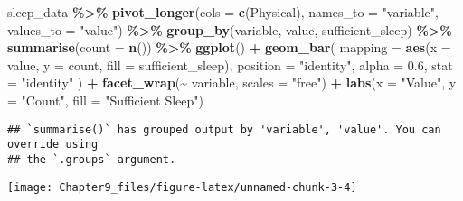 \documentclass[
  11pt,
]{article}
\newenvironment{Shaded}{\begin{snugshade}}{\end{snugshade}}
\newcommand{\AttributeTok}[1]{\textcolor[rgb]{0.13,0.29,0.53}{#1}}
\newcommand{\FloatTok}[1]{\textcolor[rgb]{0.00,0.00,0.81}{#1}}
\newcommand{\FunctionTok}[1]{\textcolor[rgb]{0.13,0.29,0.53}{\textbf{#1}}}
\newcommand{\NormalTok}[1]{#1}
\newcommand{\SpecialCharTok}[1]{\textcolor[rgb]{0.81,0.36,0.00}{\textbf{#1}}}
\newcommand{\StringTok}[1]{\textcolor[rgb]{0.31,0.60,0.02}{#1}}
\begin{document}
\begin{Shaded}
\begin{Highlighting}[]
\NormalTok{sleep\_data }\SpecialCharTok{\%\textgreater{}\%}
  \FunctionTok{pivot\_longer}\NormalTok{(}\AttributeTok{cols =} \FunctionTok{c}\NormalTok{(Physical), }\AttributeTok{names\_to =} \StringTok{"variable"}\NormalTok{, }\AttributeTok{values\_to =} \StringTok{"value"}\NormalTok{) }\SpecialCharTok{\%\textgreater{}\%}
  \FunctionTok{group\_by}\NormalTok{(variable, value, sufficient\_sleep) }\SpecialCharTok{\%\textgreater{}\%}
  \FunctionTok{summarise}\NormalTok{(}\AttributeTok{count =} \FunctionTok{n}\NormalTok{()) }\SpecialCharTok{\%\textgreater{}\%}
  \FunctionTok{ggplot}\NormalTok{() }\SpecialCharTok{+}
  \FunctionTok{geom\_bar}\NormalTok{(}
    \AttributeTok{mapping =} \FunctionTok{aes}\NormalTok{(}\AttributeTok{x =}\NormalTok{ value, }\AttributeTok{y =}\NormalTok{ count, }\AttributeTok{fill =}\NormalTok{ sufficient\_sleep),}
    \AttributeTok{position =} \StringTok{"identity"}\NormalTok{,}
    \AttributeTok{alpha =} \FloatTok{0.6}\NormalTok{,}
    \AttributeTok{stat =} \StringTok{"identity"}
\NormalTok{  ) }\SpecialCharTok{+}
  \FunctionTok{facet\_wrap}\NormalTok{(}\SpecialCharTok{\textasciitilde{}}\NormalTok{ variable, }\AttributeTok{scales =} \StringTok{"free"}\NormalTok{) }\SpecialCharTok{+}
  \FunctionTok{labs}\NormalTok{(}\AttributeTok{x =} \StringTok{"Value"}\NormalTok{, }\AttributeTok{y =} \StringTok{"Count"}\NormalTok{, }\AttributeTok{fill =} \StringTok{"Sufficient Sleep"}\NormalTok{)}
\end{Highlighting}
\end{Shaded}

\begin{verbatim}
## `summarise()` has grouped output by 'variable', 'value'. You can override using
## the `.groups` argument.
\end{verbatim}

\begin{center}\texttt{[image: Chapter9\_files/figure-latex/unnamed-chunk-3-4]} \end{center}
\end{document}
